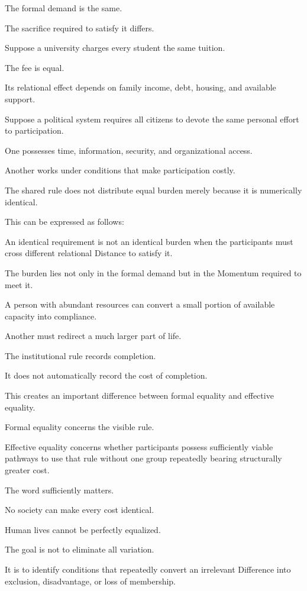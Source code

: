 The formal demand is the same.

The sacrifice required to satisfy it differs.

Suppose a university charges every student the same tuition.

The fee is equal.

Its relational effect depends on family income, debt, housing, and available support.

Suppose a political system requires all citizens to devote the same personal effort to participation.

One possesses time, information, security, and organizational access.

Another works under conditions that make participation costly.

The shared rule does not distribute equal burden merely because it is numerically identical.

This can be expressed as follows:

An identical requirement is not an identical burden when the participants must cross different relational Distance to satisfy it.

The burden lies not only in the formal demand but in the Momentum required to meet it.

A person with abundant resources can convert a small portion of available capacity into compliance.

Another must redirect a much larger part of life.

The institutional rule records completion.

It does not automatically record the cost of completion.

This creates an important difference between formal equality and effective equality.

Formal equality concerns the visible rule.

Effective equality concerns whether participants possess sufficiently viable pathways to use that rule without one group repeatedly bearing structurally greater cost.

The word sufficiently matters.

No society can make every cost identical.

Human lives cannot be perfectly equalized.

The goal is not to eliminate all variation.

It is to identify conditions that repeatedly convert an irrelevant Difference into exclusion, disadvantage, or loss of membership.

